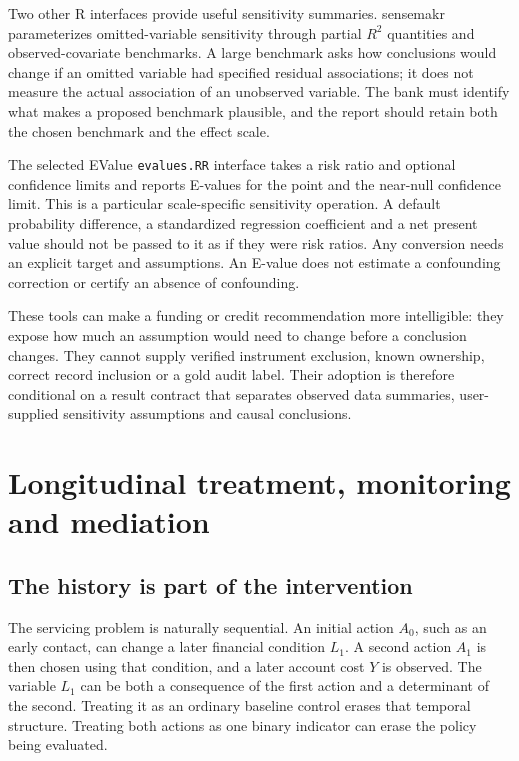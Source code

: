 Two other R interfaces provide useful sensitivity summaries. sensemakr
parameterizes omitted-variable sensitivity through partial \(R^2\) quantities
and observed-covariate benchmarks. A large benchmark asks how conclusions would
change if an omitted variable had specified residual associations; it does not
measure the actual association of an unobserved variable. The bank must identify
what makes a proposed benchmark plausible, and the report should retain both
the chosen benchmark and the effect scale.\cite{v12_sw_sensemakr}

The selected EValue \texttt{evalues.RR} interface takes a risk ratio and optional
confidence limits and reports E-values for the point and the near-null confidence
limit. This is a particular scale-specific sensitivity operation. A default
probability difference, a standardized regression coefficient and a net present
value should not be passed to it as if they were risk ratios. Any conversion
needs an explicit target and assumptions. An E-value does not estimate a
confounding correction or certify an absence of confounding.\cite{v12_sw_evalue}

These tools can make a funding or credit recommendation more intelligible:
they expose how much an assumption would need to change before a conclusion
changes. They cannot supply verified instrument exclusion, known ownership,
correct record inclusion or a gold audit label. Their adoption is therefore
conditional on a result contract that separates observed data summaries,
user-supplied sensitivity assumptions and causal conclusions.

\chapter{Longitudinal treatment, monitoring and mediation}
\label{sw:longitudinal}

\section{The history is part of the intervention}

The servicing problem is naturally sequential. An initial action \(A_0\), such
as an early contact, can change a later financial condition \(L_1\). A second
action \(A_1\) is then chosen using that condition, and a later account cost
\(Y\) is observed. The variable \(L_1\) can be both a consequence of the first
action and a determinant of the second. Treating it as an ordinary baseline
control erases that temporal structure. Treating both actions as one binary
indicator can erase the policy being evaluated.

